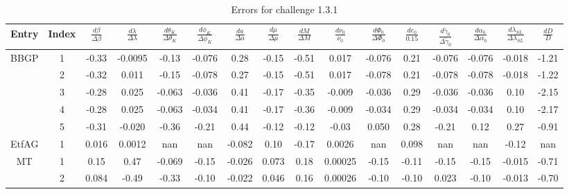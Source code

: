 \documentclass[prd,aps,amsfonts,amsmath, nofootinbib]{revtex4}
\begin{document}
\begin{table}
\caption{\label{EMRI_err} Errors for challenge 1.3.1}
\begin{ruledtabular}
\begin{tabular}{|c|c|c|c|c|c|c|c|c|c|c|c|c|c|c|c|}
Entry & Index & $\frac{d\beta}{\Delta\beta}$ & 
$\frac{d\lambda}{\Delta\lambda}$ &
 $\frac{d\theta_K}{\Delta\theta_K}$ & $\frac{d\phi_K}{\Delta\phi_K}$ 
 & $\frac{da}{\Delta a}$ & $\frac{d\mu}{\Delta\mu}$ & 
 $\frac{dM}{\Delta M}$ &  $\frac{d\nu_0}{\nu_0}$ & 
 $\frac{d\Phi_0}{\Delta\Phi_0}$ &  $\frac{de_0}{0.15}$ & 
 $\frac{d\tilde{\gamma}_0}{\Delta\tilde{\gamma}_0}$ &
 $\frac{d\alpha_0}{\Delta\alpha_0}$ & 
 $\frac{d\lambda_{SL}}{\Delta\lambda_{SL}}$ &
  $\frac{dD}{D}$ \\ 
\hline
BBGP & 1 &
 -0.33   &   -0.0095   &   -0.13   &   -0.076   &   0.28   &   -0.15   &   -0.51   &   0.017   &   -0.076   &   0.21   &   -0.076   &   -0.076   &   -0.018   &   -1.21  \\
   & 2 &
 -0.32   &   0.011   &   -0.15   &   -0.078   &   0.27   &   -0.15   &   -0.51   &   0.017   &   -0.078   &   0.21   &   -0.078   &   -0.078   &   -0.018   &   -1.22 \\ 
  & 3 &
 -0.28   &   0.025   &   -0.063   &   -0.036   &   0.41   &   -0.17   &   -0.35   &   -0.009   &   -0.036   &   0.29   &   -0.036   &   -0.036   &   0.10   &   -2.15   \\  
   &  4  &
 -0.28   &   0.025   &   -0.063   &   -0.034   &   0.41   &   -0.17   &   -0.36   &   -0.009   &   -0.034   &   0.29   &   -0.034   &   -0.034   &   0.10   &   -2.17   \\
  & 5 &
 -0.31   &   -0.020   &   -0.36   &   -0.21   &   0.44   &   -0.12   &   -0.12   &   -0.03   &   0.050   &   0.28   &   -0.21   &   0.12   &   0.27   &   -0.91   \\
 \hline
 EtfAG & 1 &
 0.016   &   0.0012   &   nan   &   nan   &   -0.082   &   0.10   &   -0.17   &   0.0026   &   nan   &   0.098   &   nan   &   nan   &   -0.12   &   nan   \\   
\hline
 MT & 1 &
 0.15   &    0.47   &   -0.069   &   -0.15   &   -0.026   &   0.073   &   0.18   &   0.00025   &   -0.15   &   -0.11   &   -0.15   &   -0.15   &   -0.015   &   -0.71   \\ 
 &  2 &
 0.084   &   -0.49   &   -0.33   &   -0.10   &   -0.022   &   0.046   &   0.16   &   0.00026   &   -0.10   &   -0.10   &   0.023   &   -0.10   &   -0.013   &   -0.70   \\ 
\hline
\end{tabular}
\end{ruledtabular}
\end{table}
\end{document}

